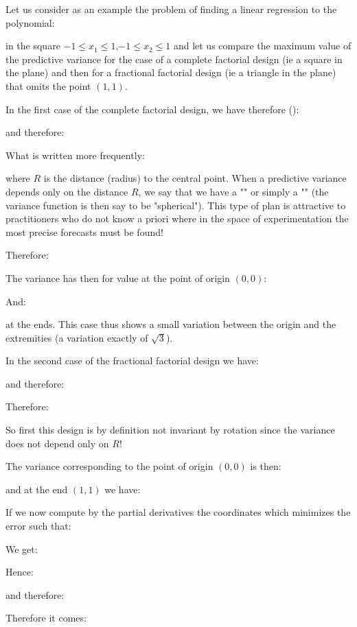 	Let us consider as an example the problem of finding a linear regression to the polynomial:
	
	in the square $-1\leq x_1 \leq 1$,$-1\leq x_2\leq 1$ and let us compare the maximum value of the predictive variance for the case of a complete factorial design (ie a square in the plane) and then for a fractional factorial design (ie a triangle in the plane) that omits the point $(1,1)$.
	
	In the first case of the complete factorial design, we have therefore ():
	
	and therefore:
	
	What is written more frequently:
	
	where $R$ is the distance (radius) to the central point. When a predictive variance depends only on the distance $R$, we say that we have a "" or simply a "" (the variance function is then say to be "spherical"). This type of plan is attractive to practitioners who do not know a priori where in the space of experimentation the most precise forecasts must be found!

	Therefore:
	
	The variance has then for value at the point of origin $(0,0)$:
	
	And:
	
 	at the ends. This case thus shows a small variation between the origin and the extremities (a variation exactly of $\sqrt{3}$).

	In the second case of the fractional factorial design we have:
	
	and therefore:
	
	Therefore:
	
	So first this design is by definition not invariant by rotation since the variance does not depend only on $R$!

	The variance corresponding to the point of origin $(0,0)$ is then:
	
 	and at the end $(1,1)$ we have:
	
 	If we now compute by the partial derivatives the coordinates which minimizes the error such that:
	
 	We get:
	
 	Hence:
	
	and therefore:
	
	Therefore it comes:
	
